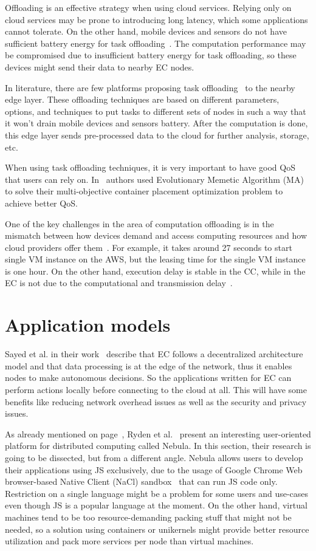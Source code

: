 Offloading is an effective strategy when using cloud services. Relying only on cloud services may be prone to introducing long latency, which some applications cannot tolerate. On the other hand, mobile devices and sensors do not have sufficient battery energy for task offloading~\cite{MaoZL16}. The computation performance may be compromised due to insufficient battery energy for task offloading, so these devices might send their data to nearby EC nodes.

In literature, there are few platforms proposing task offloading~\cite{ShiHPANZ14, KhuneP19, ChenHLLW15, LinLJL19, JiangCGZW19, MaoZL16} to the nearby edge layer. These offloading techniques are based on different parameters, options, and techniques to put tasks to different sets of nodes in such a way that it won't drain mobile devices and sensors battery. After the computation is done, this edge layer sends pre-processed data to the cloud for further analysis, storage, etc.

When using task offloading techniques, it is very important to have good QoS that users can rely on. In~\cite{SamiM20} authors used Evolutionary Memetic Algorithm (MA) to solve their multi-objective container placement optimization problem to achieve better QoS.

One of the key challenges in the area of computation offloading is in the mismatch between how devices demand and access computing resources and how cloud providers offer them~\cite{ShiHPANZ14}. For example, it takes around 27 seconds to start single VM instance on the AWS, but the leasing time for the single VM instance is one hour. On the other hand, execution delay is stable in the CC, while in the EC is not due to the computational and transmission delay~\cite{WangZMHNW18}.
%
%
\section{Application models}\label{sec:applications}
%
Sayed et al. in their work~\cite{El-SayedSPPGML18} describe that EC follows a decentralized architecture model and that data processing is at the edge of the network, thus it enables nodes to make autonomous decisions.  So the applications written for EC can perform actions locally before connecting to the cloud at all. This will have some benefits like reducing network overhead issues as well as the security and privacy issues. 

As already mentioned on page~\pageref{sec:rayden}, Ryden et al.~\cite{RydenOCW14} present an interesting user-oriented platform for distributed computing called Nebula. In this section, their research is going to be dissected, but from a different angle. Nebula allows users to develop their applications using JS exclusively, due to the usage of Google Chrome Web browser-based Native Client (NaCl) sandbox~\cite{YeeSDCMOONF10} that can run JS code only. Restriction on a single language might be a problem for some users and use-cases even though JS is a popular language at the moment. On the other hand, virtual machines tend to be too resource-demanding packing stuff that might not be needed, so a solution using containers or unikernels might provide better resource utilization and pack more services per node than virtual machines.

